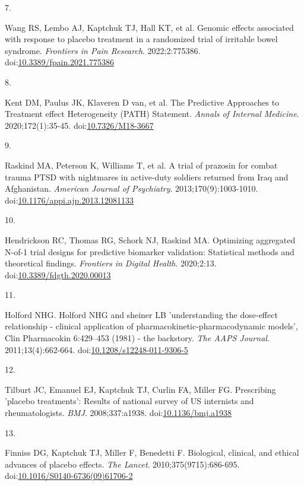 \documentclass[
  11pt,
]{article}
\newlength{\cslhangindent}
\newlength{\csllabelwidth}
\newenvironment{CSLReferences}[2] %
 {\begin{list}{}{%
  \setlength{\itemindent}{0pt}
  \setlength{\leftmargin}{0pt}
  \setlength{\parsep}{0pt}
  \ifodd #1
   \setlength{\leftmargin}{\cslhangindent}
   \setlength{\itemindent}{-1\cslhangindent}
  \fi
  \setlength{\itemsep}{#2\baselineskip}}}
 {\end{list}}
\newcommand{\CSLLeftMargin}[1]{\parbox[t]{\csllabelwidth}{\strut#1\strut}}
\newcommand{\CSLRightInline}[1]{\parbox[t]{\linewidth - \csllabelwidth}{\strut#1\strut}}
\begin{document}
\begin{CSLReferences}{0}{1}
\CSLLeftMargin{7. }%
\CSLRightInline{{Wang RS, Lembo AJ, Kaptchuk TJ, Hall KT, et al.} Genomic effects associated with response to placebo treatment in a randomized trial of irritable bowel syndrome. \emph{Frontiers in Pain Research}. 2022;2:775386. doi:\href{https://doi.org/10.3389/fpain.2021.775386}{10.3389/fpain.2021.775386}}

\CSLLeftMargin{8. }%
\CSLRightInline{{Kent DM, Paulus JK, Klaveren D van, et al.} The {P}redictive {A}pproaches to {T}reatment effect {H}eterogeneity ({PATH}) {S}tatement. \emph{Annals of Internal Medicine}. 2020;172(1):35-45. doi:\href{https://doi.org/10.7326/M18-3667}{10.7326/M18-3667}}

\CSLLeftMargin{9. }%
\CSLRightInline{{Raskind MA, Peterson K, Williams T, et al.} A trial of prazosin for combat trauma {PTSD} with nightmares in active-duty soldiers returned from {I}raq and {A}fghanistan. \emph{American Journal of Psychiatry}. 2013;170(9):1003-1010. doi:\href{https://doi.org/10.1176/appi.ajp.2013.12081133}{10.1176/appi.ajp.2013.12081133}}

\CSLLeftMargin{10. }%
\CSLRightInline{Hendrickson RC, Thomas RG, Schork NJ, Raskind MA. Optimizing aggregated {N}-of-1 trial designs for predictive biomarker validation: Statistical methods and theoretical findings. \emph{Frontiers in Digital Health}. 2020;2:13. doi:\href{https://doi.org/10.3389/fdgth.2020.00013}{10.3389/fdgth.2020.00013}}

\CSLLeftMargin{11. }%
\CSLRightInline{Holford NHG. Holford {NHG} and sheiner {LB} 'understanding the dose-effect relationship - clinical application of pharmacokinetic-pharmacodynamic models', {Clin Pharmacokin} 6:429--453 (1981) - the backstory. \emph{The AAPS Journal}. 2011;13(4):662-664. doi:\href{https://doi.org/10.1208/s12248-011-9306-5}{10.1208/s12248-011-9306-5}}

\CSLLeftMargin{12. }%
\CSLRightInline{Tilburt JC, Emanuel EJ, Kaptchuk TJ, Curlin FA, Miller FG. Prescribing 'placebo treatments': Results of national survey of {US} internists and rheumatologists. \emph{BMJ}. 2008;337:a1938. doi:\href{https://doi.org/10.1136/bmj.a1938}{10.1136/bmj.a1938}}

\CSLLeftMargin{13. }%
\CSLRightInline{Finniss DG, Kaptchuk TJ, Miller F, Benedetti F. Biological, clinical, and ethical advances of placebo effects. \emph{The Lancet}. 2010;375(9715):686-695. doi:\href{https://doi.org/10.1016/S0140-6736(09)61706-2}{10.1016/S0140-6736(09)61706-2}}


\end{CSLReferences}
\end{document}
